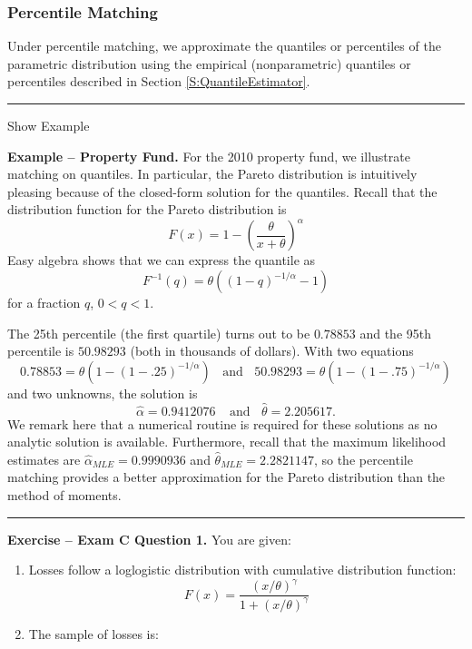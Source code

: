 \documentclass[]{book}
\providecommand{\tightlist}{%
  \setlength{\itemsep}{0pt}\setlength{\parskip}{0pt}}
\theoremstyle{definition}
\theoremstyle{definition}
\theoremstyle{definition}
\theoremstyle{remark}
\begin{document}
\subsubsection{Percentile Matching}\label{percentile-matching}

Under percentile matching, we approximate the quantiles or percentiles
of the parametric distribution using the empirical (nonparametric)
quantiles or percentiles described in Section \ref{S:QuantileEstimator}.

\begin{center}\rule{0.5\linewidth}{\linethickness}\end{center}

Show Example

\hypertarget{toggleExamplePM}{}
\textbf{Example -- Property Fund.} For the 2010 property fund, we
illustrate matching on quantiles. In particular, the Pareto distribution
is intuitively pleasing because of the closed-form solution for the
quantiles. Recall that the distribution function for the Pareto
distribution is
\[F(x) = 1 - \left(\frac{\theta}{x+\theta}\right)^{\alpha}\] Easy
algebra shows that we can express the quantile as
\[F^{-1}(q) = \theta \left( (1-q)^{-1/\alpha} -1 \right)\] for a
fraction \(q\), \(0<q<1\).

The 25th percentile (the first quartile) turns out to be \(0.78853\) and
the 95th percentile is \(50.98293\) (both in thousands of dollars). With
two equations
\[0.78853 = \theta \left( 1- (1-.25)^{-1/\alpha} \right) \ \ \ \ \text{and} \ \ \ \ 50.98293 = \theta \left( 1- (1-.75)^{-1/\alpha} \right)\]
and two unknowns, the solution is
\[\hat{\alpha} = 0.9412076 \ \ \ \ \ \text{and} \ \ \ \
\hat{\theta} = 2.205617 .\] We remark here that a numerical routine is
required for these solutions as no analytic solution is available.
Furthermore, recall that the maximum likelihood estimates are
\(\hat{\alpha}_{MLE} = 0.9990936\) and
\(\hat{\theta}_{MLE} = 2.2821147\), so the percentile matching provides
a better approximation for the Pareto distribution than the method of
moments.

\begin{center}\rule{0.5\linewidth}{\linethickness}\end{center}

\textbf{Exercise -- Exam C Question 1.} You are given:

\begin{enumerate}
\def\labelenumi{(\roman{enumi})}
\tightlist
\item
  Losses follow a loglogistic distribution with cumulative distribution
  function:
  \[F(x) = \frac{\left(x/\theta\right)^{\gamma}}{1+\left(x/\theta\right)^{\gamma}}\]
\item
  The sample of losses is:
\end{enumerate}
\end{document}
